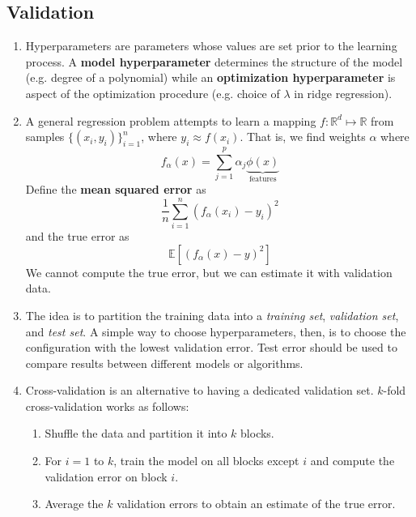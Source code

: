 \documentclass[10pt]{article}
\begin{document}
\begin{multicols}{2}
\begin{addmargin}[0.8em]{0.5em}
    \subsection{Validation}
    \vspace{-0.2cm}
    \begin{enumerate}[label=(\alph*)]
        \item Hyperparameters are parameters whose values are set prior to the learning process. A \textbf{model hyperparameter} determines the structure of the model (e.g. degree of a polynomial) while an \textbf{optimization hyperparameter} is aspect of the optimization procedure (e.g. choice of $\lambda$ in ridge regression).
        \item A general regression problem attempts to learn a mapping $f: \mathbb{R}^d \mapsto \mathbb{R}$ from samples $\{(x_i, y_i)\}_{i=1}^n$, where $y_i \approx f(x_i)$. That is, we find weights $\alpha$ where
        $$
        f_\alpha(x) = \sum_{j=1}^p \alpha_j \underbrace{\phi(x)}_{\text{features}}
        $$
        Define the \textbf{mean squared error} as
        $$
        \frac{1}{n} \sum_{i=1}^n (f_\alpha(x_i) - y_i)^2
        $$
        and the true error as
        $$
        \mathbb{E} \left[ (f_\alpha(x) - y)^2 \right]
        $$
        We cannot compute the true error, but we can estimate it with validation data.
        \item The idea is to partition the training data into a \textit{training set}, \textit{validation set}, and \textit{test set}. A simple way to choose hyperparameters, then, is to choose the configuration with the lowest validation error. Test error should be used to compare results between different models or algorithms.
        \item Cross-validation is an alternative to having a dedicated validation set. $k$-fold cross-validation works as follows:
        \begin{enumerate}
        \item Shuffle the data and partition it into $k$ blocks.
        \item For $i=1$ to $k$, train the model on all blocks except $i$ and compute the validation error on block $i$.
        \item Average the $k$ validation errors to obtain an estimate of the true error.
        \end{enumerate}
    \end{enumerate}
    
    \vspace{-0.2cm}

\end{addmargin}
\end{multicols}
\end{document}
